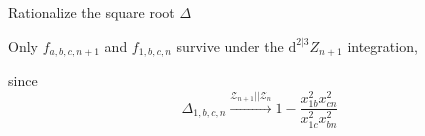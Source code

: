 \documentclass[10pt]{beamer}
\newcommand{\dif}{\mathrm{d}}
\begin{document}
\begin{frame}{Rationalize the square root $\Delta$}

Only $f_{a,b,c,n+1}$ and $f_{1,b,c,n}$ survive under the $\dif^{2\vert3}Z_{n+1}$ integration,

since
\[
\Delta_{1,b,c,n} \xrightarrow[]{\mathcal{Z}_{n+1}\vert\vert \mathcal{Z}_{n}} 1-\frac{x_{1b}^{2}x_{cn}^{2}}{x_{1c}^{2}x_{bn}^{2}}
\]




\end{frame}
\end{document}
